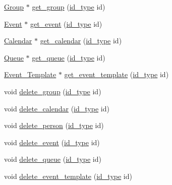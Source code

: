 \begin{DoxyCompactItemize}
\item 
\hyperlink{classGroup}{Group} $\ast$ \hyperlink{classstorage_1_1DataStorage_a53e3931141b50ff3d5bfd7e682092091}{get\_\-group} (\hyperlink{types_8h_a0b60c08a3ab1435cccc5643d32d8ccee}{id\_\-type} id)
\item 
\hyperlink{classEvent}{Event} $\ast$ \hyperlink{classstorage_1_1DataStorage_af68ca095bb27db3b8532045f77b5ae73}{get\_\-event} (\hyperlink{types_8h_a0b60c08a3ab1435cccc5643d32d8ccee}{id\_\-type} id)
\item 
\hyperlink{classCalendar}{Calendar} $\ast$ \hyperlink{classstorage_1_1DataStorage_a38b24aa35d0f1159200c78e53a0c99bb}{get\_\-calendar} (\hyperlink{types_8h_a0b60c08a3ab1435cccc5643d32d8ccee}{id\_\-type} id)
\item 
\hyperlink{classQueue}{Queue} $\ast$ \hyperlink{classstorage_1_1DataStorage_a38f0afa3026ff4c41e25c85648d24cd1}{get\_\-queue} (\hyperlink{types_8h_a0b60c08a3ab1435cccc5643d32d8ccee}{id\_\-type} id)
\item 
\hyperlink{classEvent__Template}{Event\_\-Template} $\ast$ \hyperlink{classstorage_1_1DataStorage_a085a420bbfdb5aad5ca5ed2396bca656}{get\_\-event\_\-template} (\hyperlink{types_8h_a0b60c08a3ab1435cccc5643d32d8ccee}{id\_\-type} id)
\item 
void \hyperlink{classstorage_1_1DataStorage_afdcd88ea1431926e2573ecbca72cf7a9}{delete\_\-group} (\hyperlink{types_8h_a0b60c08a3ab1435cccc5643d32d8ccee}{id\_\-type} id)
\item 
void \hyperlink{classstorage_1_1DataStorage_ac87846227576aff38920d4a0a56718b5}{delete\_\-calendar} (\hyperlink{types_8h_a0b60c08a3ab1435cccc5643d32d8ccee}{id\_\-type} id)
\item 
void \hyperlink{classstorage_1_1DataStorage_a16ec2023c236757fd8ff7abab2ecf74d}{delete\_\-person} (\hyperlink{types_8h_a0b60c08a3ab1435cccc5643d32d8ccee}{id\_\-type} id)
\item 
void \hyperlink{classstorage_1_1DataStorage_a92302162f0c37753f7acadfb82a951f4}{delete\_\-event} (\hyperlink{types_8h_a0b60c08a3ab1435cccc5643d32d8ccee}{id\_\-type} id)
\item 
void \hyperlink{classstorage_1_1DataStorage_ae4741645dcf5d1efd8bfbaa4422c929a}{delete\_\-queue} (\hyperlink{types_8h_a0b60c08a3ab1435cccc5643d32d8ccee}{id\_\-type} id)
\item 
void \hyperlink{classstorage_1_1DataStorage_a72e75a91ab796b9b219443da461928e4}{delete\_\-event\_\-template} (\hyperlink{types_8h_a0b60c08a3ab1435cccc5643d32d8ccee}{id\_\-type} id)
\item 

\end{DoxyCompactItemize}
